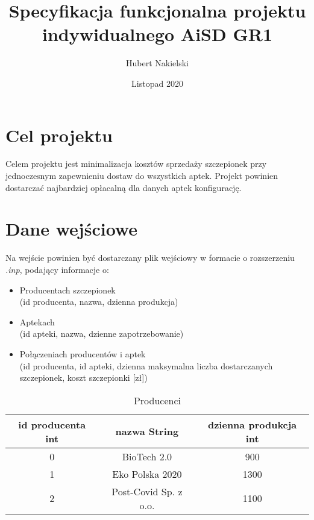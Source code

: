 \documentclass[]{article}
\title{Specyfikacja funkcjonalna projektu indywidualnego \textbf{AiSD GR1}}
\author{Hubert Nakielski}
\date{Listopad 2020}
\begin{document}
\maketitle

\section{Cel projektu}
Celem projektu jest minimalizacja kosztów sprzedaży szczepionek przy jednoczesnym
 zapewnieniu dostaw do wszystkich aptek. Projekt powinien dostarczać najbardziej opłacalną 
 dla danych aptek konfigurację.
 
\section{Dane wejściowe}
Na wejście powinien być dostarczany plik wejściowy w formacie o rozszerzeniu \textit{.inp}, podający informacje o: \\
\begin{itemize}


\item
Producentach szczepionek \\
(id producenta, nazwa, dzienna produkcja)\\
\item
Aptekach\\ (id apteki, nazwa, dzienne zapotrzebowanie)\\
\item
Połączeniach producentów i aptek \\(id producenta, id apteki, dzienna maksymalna liczba dostarczanych szczepionek, koszt 
szczepionki [zł])

\end{itemize}


\begin{table}[h!]
\caption{Producenci }
\begin{tabular}{|c|c|c|}
\hline
\rowcolor[HTML]{C0C0C0} 
\textbf{id producenta} int  & \textbf{nazwa} String      & \textbf{dzienna produkcja}  int \\ \hline
0               & BioTech 2.0             & 900                      \\ \hline
1               & Eko Polska 2020         & 1300                     \\ \hline
2               & Post-Covid Sp. z o.o.   & 1100                     \\ \hline
\end{tabular}
\end{table}
\end{document}
